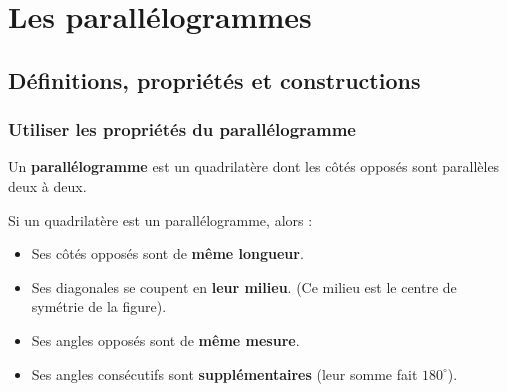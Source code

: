 \documentclass[a4paper]{book}
\begin{document}
\setcounter{chapter}{11}
\renewcommand{\monTitre}{Les parallélogrammes}
\chapter{\monTitre}
\thispagestyle{fancy}

\section{Définitions, propriétés et constructions}
\subsection{Utiliser les propriétés du parallélogramme}

    \begin{definition}
        Un \textbf{parallélogramme} est un quadrilatère dont les côtés opposés sont parallèles deux à deux.
    \end{definition}
    
    
    \begin{propriete}
        Si un quadrilatère est un parallélogramme, alors :
        \begin{itemize}
            \item Ses côtés opposés sont de \textbf{même longueur}.
            \item Ses diagonales se coupent en \textbf{leur milieu}. (Ce milieu est le centre de symétrie de la figure).
            \item Ses angles opposés sont de \textbf{même mesure}.
            \item Ses angles consécutifs sont \textbf{supplémentaires} (leur somme fait $180^{\circ}$).
        \end{itemize}
    \end{propriete}
    
\end{document}

